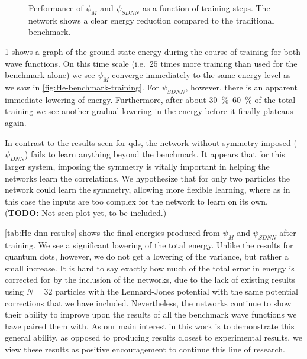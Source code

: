 \documentclass[Thesis.tex]{subfiles}
\begin{document}
\begin{figure}[h]
  \centering
  
  \caption[Learning progression of a neural network on liquid helium]{\label{fig:He-dnn-training}Performance of $\psi_M$ and $\psi_{SDNN}$
    as a function of training steps. The network shows a clear energy reduction
    compared to the traditional benchmark.}
\end{figure}

\cref{fig:He-dnn-training} shows a graph of the ground state energy during the
course of training for both wave functions. On this time scale (i.e.\ $\num{25}$
times more training than used for the benchmark alone) we see $\psi_M$ converge
immediately to the same energy level as we saw in
\cref{fig:He-benchmark-training}. For $\psi_{SDNN}$, however, there is an
apparent immediate lowering of energy. Furthermore, after about
\SIrange{30}{60}{\percent} of the total training we see another gradual lowering
in the energy before it finally plateaus again.

In contrast to the results seen for \glspl{qd}, the network without symmetry
imposed ($\psi_{DNN}$) fails to learn anything beyond the benchmark. It appears
that for this larger system, imposing the symmetry is vitally important in
helping the networks learn the correlations. We hypothesize that for only two
particles the network could learn the symmetry, allowing more
flexible learning, where as in this case the inputs are too complex for the
network to learn on its own. (\textbf{TODO:} Not seen plot yet,
to be included.)

\cref{tab:He-dnn-results} shows the final energies produced from $\psi_{M}$ and
$\psi_{SDNN}$ after training. We see a significant lowering of the total energy.
Unlike the results for quantum dots, however, we do not get a lowering of the
variance, but rather a small increase. It is hard to say exactly how much of the
total error in energy is corrected for by the inclusion of the networks, due to
the lack of existing results using $N=32$ particles with the Lennard-Jones
potential with the same potential corrections that we have included.
Nevertheless, the networks continue to show their ability to improve upon the
results of all the benchmark wave functions we have paired them with. As our
main interest in this work is to demonstrate this general ability, as opposed to
producing results closest to experimental results, we view these results as
positive encouragement to continue this line of research.

\begin{table}[h]
  \centering
  \caption[Energy estimates using a neural network on $^4$He]{\label{tab:He-dnn-results}Predicted ground state energy of both
    $\psi_M$ and $\psi_{SDNN}$ after the same amount of optimization. Results
    obtained from $2^{23}$ samples and with errors estimated using
    blocking. Energies in units of Kelvin per particle $[\si{\kelvin\per N}]$. See \cref{fig:He-dnn-training} for source code reference.}
  
\end{table}
\end{document}

